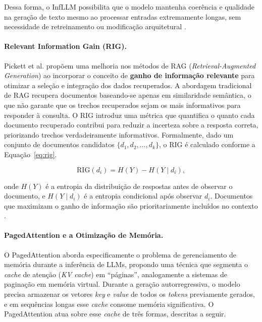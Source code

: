 Dessa forma, o InfLLM possibilita que o modelo mantenha coerência e qualidade na geração de texto mesmo ao processar entradas extremamente longas, sem necessidade de retreinamento ou modificação arquitetural \cite{xiao2024infllm}.

\paragraph{Relevant Information Gain (RIG).}
Pickett et al. \cite{pickett2024rig} propõem uma melhoria nos métodos de RAG (\textit{Retrieval-Augmented Generation}) ao incorporar o conceito de \textbf{ganho de informação relevante} para otimizar a seleção e integração dos dados recuperados. A abordagem tradicional de RAG recupera documentos baseando-se apenas em similaridade semântica, o que não garante que os trechos recuperados sejam os mais informativos para responder à consulta. O RIG introduz uma métrica que quantifica o quanto cada documento recuperado contribui para reduzir a incerteza sobre a resposta correta, priorizando trechos verdadeiramente informativos. Formalmente, dado um conjunto de documentos candidatos $\{d_1, d_2, \ldots, d_k\}$, o RIG é calculado conforme a Equação~\ref{eq:rig}.

\begin{equation}
\label{eq:rig}
\mathrm{RIG}(d_i) = H(Y) - H(Y \mid d_i),
\end{equation}

onde $H(Y)$ é a entropia da distribuição de respostas antes de observar o documento, e $H(Y \mid d_i)$ é a entropia condicional após observar $d_i$. Documentos que maximizam o ganho de informação são prioritariamente incluídos no contexto \cite{pickett2024rig}.

\paragraph{PagedAttention e a Otimização de Memória.}
O PagedAttention \cite{kwon2023pagedattention} aborda especificamente o problema de gerenciamento de memória durante a inferência de LLMs, propondo uma técnica que segmenta o \textit{cache} de atenção (\textit{KV cache}) em ``páginas'', analogamente a sistemas de paginação em memória virtual. Durante a geração autorregressiva, o modelo precisa armazenar os vetores \textit{key} e \textit{value} de todos os \textit{tokens} previamente gerados, e em sequências longas esse \textit{cache} consome memória significativa. O PagedAttention atua sobre esse \textit{cache} de três formas, descritas a seguir.

